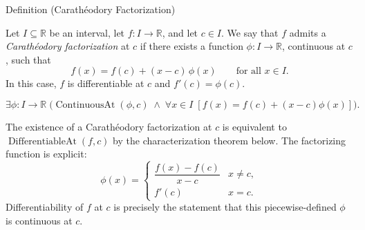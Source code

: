 
\begin{definitionbox}{Definition (Carath\'{e}odory Factorization)}
\begin{definition}
\label{def:caratheodory-factorization}
Let $I \subseteq \mathbb{R}$ be an interval, let $f : I \to \mathbb{R}$, and let $c \in I$. We say that $f$ admits a \emph{Carath\'{e}odory factorization} at $c$ if there exists a function $\phi : I \to \mathbb{R}$, continuous at $c$, such that
\[
f(x) = f(c) + (x-c)\,\phi(x) \qquad \text{for all } x \in I.
\]
In this case, $f$ is differentiable at $c$ and $f'(c) = \phi(c)$.
\end{definition}
\end{definitionbox}

\begin{remark*}
\[
\exists \phi : I \to \mathbb{R}\;
\bigl(\operatorname{ContinuousAt}(\phi,c)
\;\land\;
\forall x \in I\;[f(x) = f(c)+(x-c)\phi(x)]\bigr).
\]
\end{remark*}

\begin{remark*}
The existence of a Carath\'{e}odory factorization at $c$ is equivalent to $\operatorname{DifferentiableAt}(f,c)$ by the characterization theorem below. The factorizing function is explicit:
\[
\phi(x) =
\begin{cases}
\dfrac{f(x)-f(c)}{x-c} & x \neq c, \\[6pt]
f'(c) & x = c.
\end{cases}
\]
Differentiability of $f$ at $c$ is precisely the statement that this piecewise-defined $\phi$ is continuous at $c$.
\end{remark*}

